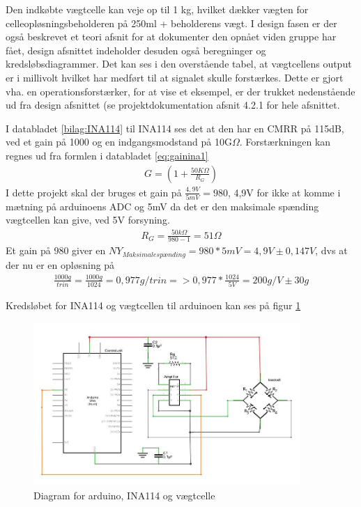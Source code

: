 Den indkøbte vægtcelle kan veje op til 1 kg, hvilket dækker vægten for celleopløsningsbeholderen på 250ml + beholderens vægt. I design fasen er der også beskrevet et teori afsnit for at dokumenter den opnået viden gruppe har fået, design afsnittet indeholder desuden også beregninger og kredsløbsdiagrammer. Det kan ses i den overstående tabel, at vægtcellens output er i millivolt hvilket har medført til at signalet skulle forstærkes. Dette er gjort vha. en operationsforstærker, for at vise et eksempel, er der trukket nedenstående ud fra design afsnittet (se projektdokumentation afsnit 4.2.1  for hele afsnittet. 

I databladet \ref{bilag:INA114} til INA114 ses det at den har en CMRR på 115dB, ved et gain på 1000 og en indgangsmodstand på 10G$\Omega$. Forstærkningen kan regnes ud fra formlen i databladet \ref{eq:gainina1}
\begin{align}
 G=(1+\frac{50K\Omega}{R_{G}})
 \label{eq:gainina1}
 \end{align} 
 I dette projekt skal der bruges et gain på $\frac{4,9V}{5mV}=980$, 4,9V for ikke at komme i mætning på arduinoens ADC og 5mV da det er den maksimale spænding vægtcellen kan give, ved 5V forsyning.
 \begin{align}
 R_{G}=\frac{50k\Omega}{980-1}=51\Omega
 \label{eq:gainina2}
 \end{align}
Et gain på 980 giver en $NY_{Maksimalespænding}=980*5mV=4,9V \pm0,147V$, dvs at der nu er en opløsning på
\begin{align}
 \frac{1000g}{trin}=\frac{1000g}{1024}=0,977g/trin=>0,977*\frac{1024}{5V}=200g/V \pm30g
 \label{eq:gainina3}
 \end{align}
 
 Kredsløbet for INA114 og vægtcellen til arduinoen kan ses på figur \ref{fig:loadcelldiagram}
 
  \begin{figure}[H]
	\centering
	\includegraphics[width=0.9\textwidth]{billeder/Hardware/diagrammer/loadcelldiagram.JPG}
	\caption{Diagram for arduino, INA114 og vægtcelle}
	\label{fig:loadcelldiagram}
\end{figure}

